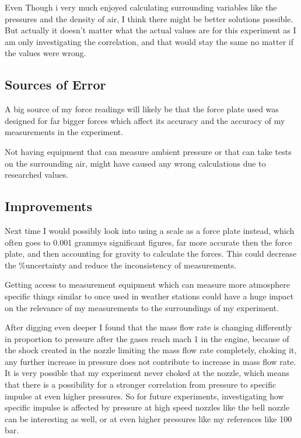 \documentclass[12pt,a4paper]{article}
\begin{document}
Even Though i very much enjoyed calculating surrounding variables like the pressures and the density of air, I think there might be better solutions possible. But actually it doesn't matter what the actual values are for this experiment as I am only investigating the correlation, and that would stay the same no matter if the values were wrong.

\subsection{Sources of Error}

A big source of my force readings will likely be that the force plate used was designed for far bigger forces which affect its accuracy and the accuracy of my measurements in the experiment.

Not having equipment that can measure ambient pressure or that can take tests on the surrounding air, might have caused any wrong calculations due to researched values.

\subsection{Improvements}

Next time I would possibly look into using a scale as a force plate instead, which often goes to 0.001 grammys significant figures, far more accurate then the force plate, and then accounting for gravity to calculate the forces. This could decrease the \%uncertainty and reduce the inconsistency of measurements.

Getting access to measurement equipment which can measure more atmosphere specific things similar to once used in weather stations could have a huge impact on the relevance of my measurements to the surroundings of my experiment.

After digging even deeper I found that the mass flow rate is changing differently in proportion to pressure after the gases reach mach 1 in the engine, because of the shock created in the nozzle limiting the mass flow rate completely, choking it, any further increase in pressure does not contribute to increase in mass flow rate. It is very possible that my experiment never choked at the nozzle, which means that there is a possibility for a stronger correlation from pressure to specific impulse at even higher pressures. So for future experiments, investigating how specific impulse is affected by pressure at high speed nozzles like the bell nozzle can be interesting as well, or at even higher pressures like my references like 100 bar.
\end{document}
